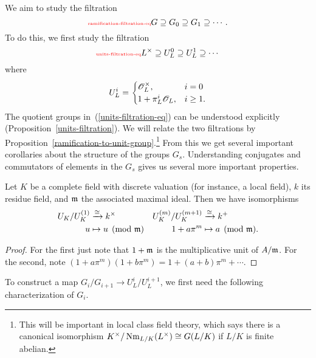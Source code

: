 We aim to study the filtration 
\begin{equation}\llabel{ramification-filtration-eq}
G\supeq G_0\supeq G_1\supeq \cdots.
\end{equation}
To do this, we first study the filtration
\begin{equation}\llabel{units-filtration-eq}
L^{\times}\supeq U_L^0 \supeq U_L^1\supeq\cdots
\end{equation}
where 
\[U_L^i=
\begin{cases}
\mathscr{O}_L^{\times},&i=0\\
1+\pi_L^i\mathscr{O}_L,&i\ge 1.
\end{cases}
\]
The quotient groups in~(\ref{units-filtration-eq}) can be understood explicitly (Proposition~\ref{units-filtration}). We will relate the two filtrations by Proposition~\ref{ramification-to-unit-group}.\footnote{This will be important in local class field theory, which says there is a canonical isomorphism $K^{\times}/\operatorname{Nm}_{L/K}(L^{\times})\cong G(L/K)$ if $L/K$ is finite abelian.} From this we get several important corollaries about the structure of the groups $G_s$. Understanding conjugates and commutators of elements in the $G_s$ gives us several more important properties.

\begin{pr}
Let $K$ be a complete field with discrete valuation (for instance, a local field), $k$ its residue field, and $\mathfrak{m}$ the associated maximal ideal. %
Then we have isomorphisms
\begin{align*}
U_K/U_K^{(1)}&\xrightarrow{\cong} k^{\times}&
U_K^{(m)}/U_K^{(m+1)}&\xrightarrow{\cong} k^+\\
u&\mapsto u\pmod{\mathfrak{m}}&
1+a\pi^m&\mapsto a\pmod{\mathfrak{m}}.
\end{align*}
\end{pr}
\begin{proof}
For the first just note that $1+\mathfrak{m}$ is the multiplicative unit of $A/\mathfrak{m}$. For the second, note $(1+a\pi^m)(1+b\pi^m)=1+(a+b)\pi^m+\cdots$.
\end{proof}
To construct a map $G_i/G_{i+1}\to U_L^i/U_L^{i+1}$, we first need the following characterization of $G_i$. 

